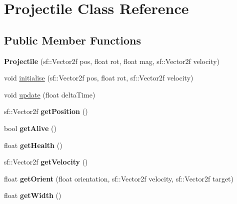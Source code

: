 \hypertarget{class_projectile}{}\section{Projectile Class Reference}
\label{class_projectile}
\subsection*{Public Member Functions}
\begin{DoxyCompactItemize}
\item 
\mbox{\label{class_projectile_aa89daaa748dc847bd0ed4c5b131e18c1}} 
{\bfseries Projectile} (sf\+::\+Vector2f pos, float rot, float mag, sf\+::\+Vector2f velocity)
\item 
void \mbox{\hyperlink{class_projectile_a9b1fe47f547a234439f87adc8759df8d}{initialise}} (sf\+::\+Vector2f pos, float rot, sf\+::\+Vector2f velocity)
\item 
void \mbox{\hyperlink{class_projectile_a5bc646de87829b911d6817a6478c353e}{update}} (float delta\+Time)
\item 
\mbox{\label{class_projectile_a88ed5be04ec9eddeb83deb201607368c}} 
sf\+::\+Vector2f {\bfseries get\+Position} ()
\item 
\mbox{\label{class_projectile_acdcf53a4c078135f7d7cd86871c9bb91}} 
bool {\bfseries get\+Alive} ()
\item 
\mbox{\label{class_projectile_a983d5d433a3dc8c6124e7efe2a57c635}} 
float {\bfseries get\+Health} ()
\item 
\mbox{\label{class_projectile_a92bcfb9a5b0fdcdaf73bf38502f22304}} 
sf\+::\+Vector2f {\bfseries get\+Velocity} ()
\item 
\mbox{\label{class_projectile_aebced9bbe25d8b9a3b214a12201a04d9}} 
float {\bfseries get\+Orient} (float orientation, sf\+::\+Vector2f velocity, sf\+::\+Vector2f target)
\item 
\mbox{\label{class_projectile_afb7d5c794f26e495ccbc5b597bb01246}} 
float {\bfseries get\+Width} ()
\item 
\mbox{\label{class_projectile_a70d55ea52a1d6cdaf74c894d412597d1}} 

\end{DoxyCompactItemize}
